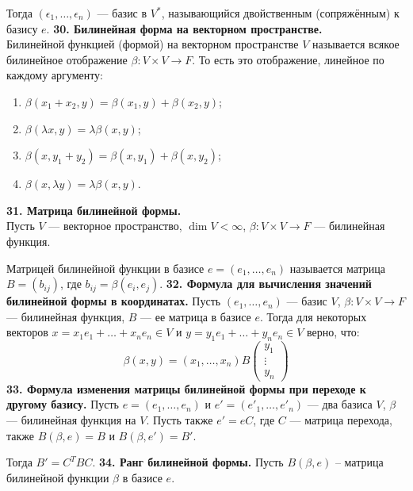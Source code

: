 \documentclass{article}
\begin{document}
Тогда $(\epsilon_1, \ldots, \epsilon_n)$ --- базис в $V^*$, называющийся двойственным (сопряжённым) к базису $e$.
\newline
\newline
\textbf{30. Билинейная форма на векторном пространстве.}\\
Билинейной функцией (формой) на векторном пространстве $V$ называется всякое билинейное отображение $\beta \colon V \times V \rightarrow F$. То есть это отображение, линейное по каждому аргументу:
\begin{enumerate}
\item $\beta(x_1 + x_2, y) = \beta(x_1, y) + \beta(x_2, y)$; 
\item $\beta(\lambda x, y) = \lambda\beta(x, y)$;
\item $\beta(x, y_1 + y_2) = \beta(x, y_1) + \beta(x, y_2)$;
\item $\beta(x, \lambda y) = \lambda\beta(x, y)$.
\end{enumerate}
\textbf{31. Матрица билинейной формы.}\\
Пусть $V$ --- векторное пространство, $\dim V < \infty$, $\beta \colon V \times V \rightarrow F$ --- билинейная функция.

Матрицей билинейной функции в базисе $e = (e_1, \ldots, e_n)$ называется матрица $B = (b_{ij})$, где $b_{ij}= \beta(e_i, e_j)$.
\newline
\newline
\textbf{32. Формула для вычисления значений билинейной формы в координатах.}
Пусть $(e_1, \ldots, e_n)$ --- базис $V$, $\beta \colon V \times V \to F$ --- билинейная функция, $B$ --- ее матрица в базисе $e $. Тогда для некоторых векторов $x = x_1e_1 + \ldots + x_ne_n \in V$ и $y = y_1e_1 + \ldots + y_ne_n \in V$ верно, что:
$$
\beta(x, y) = (x_1, \ldots, x_n)B \begin{pmatrix}y_1\\ \vdots \\ y_n \end{pmatrix}
$$
\textbf{33. Формула изменения матрицы билинейной формы при переходе к другому базису.}
Пусть $e = (e_1, \ldots, e_n)$ и $e' = (e'_1, \ldots, e'_n)$ --- два базиса $V$, $\beta$ --- билинейная функция на $V$. Пусть также $e' = e C$, где $C$ --- матрица перехода, также $B(\beta, e) = B$ и $B(\beta, e') = B'$.

Тогда $B' = C^TBC$.
\newline
\newline
\textbf{34. Ранг билинейной формы.}
Пусть $B(\beta, e)$ -- матрица билинейной функции $\beta$ в базисе $e$.
\end{document}
